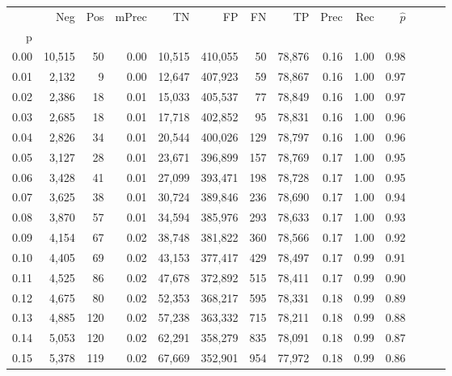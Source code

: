 \begin{tabular}{rrrrrrrrrrrrrr}
\toprule
{} &     Neg &    Pos & mPrec &       TN &       FP &      FN &      TP &  Prec &   Rec & $\hat{p}$ \\
p    &         &        &       &          &          &         &         &       &       &           \\
\midrule
0.00 &  10,515 &     50 &  0.00 &   10,515 &  410,055 &      50 &  78,876 &  0.16 &  1.00 &      0.98 \\
0.01 &   2,132 &      9 &  0.00 &   12,647 &  407,923 &      59 &  78,867 &  0.16 &  1.00 &      0.97 \\
0.02 &   2,386 &     18 &  0.01 &   15,033 &  405,537 &      77 &  78,849 &  0.16 &  1.00 &      0.97 \\
0.03 &   2,685 &     18 &  0.01 &   17,718 &  402,852 &      95 &  78,831 &  0.16 &  1.00 &      0.96 \\
0.04 &   2,826 &     34 &  0.01 &   20,544 &  400,026 &     129 &  78,797 &  0.16 &  1.00 &      0.96 \\
0.05 &   3,127 &     28 &  0.01 &   23,671 &  396,899 &     157 &  78,769 &  0.17 &  1.00 &      0.95 \\
0.06 &   3,428 &     41 &  0.01 &   27,099 &  393,471 &     198 &  78,728 &  0.17 &  1.00 &      0.95 \\
0.07 &   3,625 &     38 &  0.01 &   30,724 &  389,846 &     236 &  78,690 &  0.17 &  1.00 &      0.94 \\
0.08 &   3,870 &     57 &  0.01 &   34,594 &  385,976 &     293 &  78,633 &  0.17 &  1.00 &      0.93 \\
0.09 &   4,154 &     67 &  0.02 &   38,748 &  381,822 &     360 &  78,566 &  0.17 &  1.00 &      0.92 \\
0.10 &   4,405 &     69 &  0.02 &   43,153 &  377,417 &     429 &  78,497 &  0.17 &  0.99 &      0.91 \\
0.11 &   4,525 &     86 &  0.02 &   47,678 &  372,892 &     515 &  78,411 &  0.17 &  0.99 &      0.90 \\
0.12 &   4,675 &     80 &  0.02 &   52,353 &  368,217 &     595 &  78,331 &  0.18 &  0.99 &      0.89 \\
0.13 &   4,885 &    120 &  0.02 &   57,238 &  363,332 &     715 &  78,211 &  0.18 &  0.99 &      0.88 \\
0.14 &   5,053 &    120 &  0.02 &   62,291 &  358,279 &     835 &  78,091 &  0.18 &  0.99 &      0.87 \\
0.15 &   5,378 &    119 &  0.02 &   67,669 &  352,901 &     954 &  77,972 &  0.18 &  0.99 &      0.86 \\

\end{tabular}
